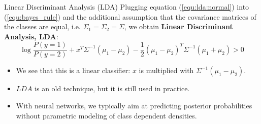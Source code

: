 \documentclass[xcolor=pdftex,dvipsnames,table]{beamer}
\begin{document}
\begin{frame}{Linear Discriminant Analysis (LDA)}
Plugging equation (\ref{equ:lda:normal}) into (\ref{equ:bayes_rule}) and the additional assumption that the covariance matrices of the classes are equal, i.e. $\Sigma_1 = \Sigma_2 = \Sigma$, we obtain {\bf Linear Discriminant Analysis, LDA}:
\begin{equation*}
\log{\frac{P(y=1)}{P(y=2)}} + x^T\Sigma^{-1}(\mu_1-\mu_2) - \frac{1}{2}(\mu_1-\mu_2)^T\Sigma^{-1}(\mu_1+\mu_2) > 0
\end{equation*}
\begin{itemize}
	\item We see that this is a linear classifier: $x$ is multiplied with $\Sigma^{-1}(\mu_1-\mu_2)$. 
	\item $LDA$ is an old technique, but it is still used in practice. 
	\item With neural networks, we typically aim at predicting posterior probabilities without parametric modeling of class dependent densities. 
\end{itemize}
\end{frame}

\end{document}
